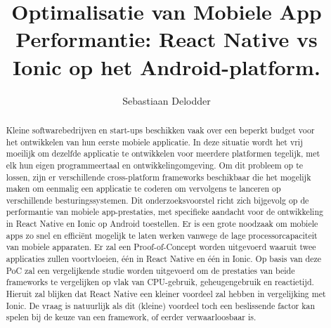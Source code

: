 \documentclass{hogent-article}
\title{Optimalisatie van Mobiele App Performantie: React Native vs Ionic op het Android-platform.}
\author{Sebastiaan Delodder}
\begin{document}
\begin{abstract}
  Kleine softwarebedrijven en start-ups beschikken vaak over een beperkt budget voor het ontwikkelen van hun eerste mobiele applicatie. In deze situatie wordt het vrij moeilijk om dezelfde applicatie te ontwikkelen voor meerdere platformen tegelijk, met elk hun eigen programmeertaal en ontwikkelingomgeving. Om dit probleem op te lossen, zijn er verschillende cross-platform frameworks beschikbaar die het mogelijk maken om eenmalig een applicatie te coderen om vervolgens te lanceren op verschillende besturingssystemen. Dit onderzoeksvoorstel richt zich bijgevolg op de performantie van mobiele app-prestaties, met specifieke aandacht voor de ontwikkeling in React Native en Ionic op Android toestellen. Er is een grote noodzaak om mobiele apps zo snel en efficiënt mogelijk te laten werken vanwege de lage processorcapaciteit van mobiele apparaten. Er zal een Proof-of-Concept worden uitgevoerd waaruit twee applicaties zullen voortvloeien, één in React Native en één in Ionic. Op basis van deze PoC zal een vergelijkende studie worden uitgevoerd om de prestaties van beide frameworks te vergelijken op vlak van CPU-gebruik, geheugengebruik en reactietijd. Hieruit zal blijken dat React Native een kleiner voordeel zal hebben in vergelijking met Ionic. De vraag is natuurlijk als dit (kleine) voordeel toch een beslissende factor kan spelen bij de keuze van een framework, of eerder verwaarloosbaar is.
\end{abstract}

\tableofcontents



\printbibliography[heading=bibintoc]
\end{document}
